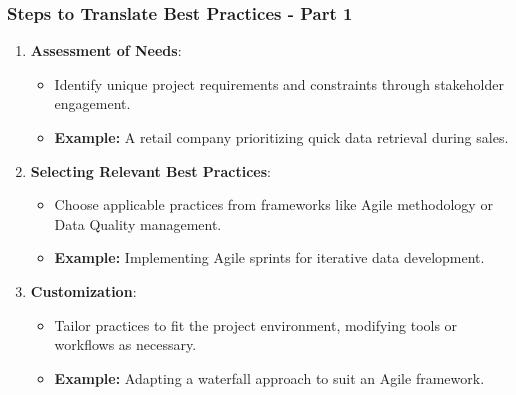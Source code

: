 \documentclass[aspectratio=169]{beamer}
\begin{document}
\begin{frame}[fragile]
    \frametitle{Steps to Translate Best Practices - Part 1}
    \begin{enumerate}
        \item \textbf{Assessment of Needs}:
            \begin{itemize}
                \item Identify unique project requirements and constraints through stakeholder engagement.
                \item \textbf{Example:} A retail company prioritizing quick data retrieval during sales.
            \end{itemize}

        \item \textbf{Selecting Relevant Best Practices}:
            \begin{itemize}
                \item Choose applicable practices from frameworks like Agile methodology or Data Quality management.
                \item \textbf{Example:} Implementing Agile sprints for iterative data development.
            \end{itemize}

        \item \textbf{Customization}:
            \begin{itemize}
                \item Tailor practices to fit the project environment, modifying tools or workflows as necessary.
                \item \textbf{Example:} Adapting a waterfall approach to suit an Agile framework.
            \end{itemize}
    \end{enumerate}
\end{frame}
\end{document}
